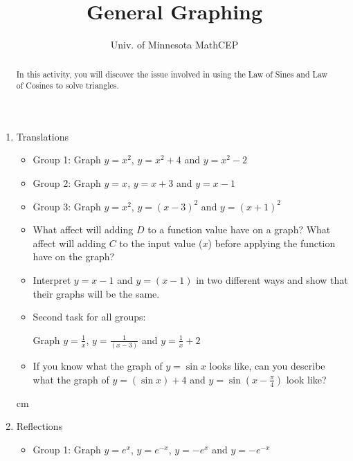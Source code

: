 \documentclass[number]{ximera}
\title{General Graphing}
\author{Univ. of Minnesota MathCEP}
\begin{document}
\begin{abstract}
  In this activity, you will discover the issue involved in using the Law of Sines and Law of Cosines to solve triangles.
\end{abstract}

\maketitle

\begin{enumerate}

\item Translations

\begin{itemize}

\item Group 1: Graph $y = x^2$, $y = x^2 + 4$ and $y = x^2 - 2$

\item Group 2: Graph $y = x$, $y = x+3$ and $y=x-1$

\item Group 3: Graph $y = x^2$, $y = (x-3)^2$ and $y = (x+1)^2$

\item What affect will adding $D$ to a function value have on a graph? What affect will adding $C$ to the input value ($x$) before applying the function have on the graph?

\item Interpret $y = x-1$ and $y = (x-1)$ in two different ways and show that their graphs will be the same.

\item Second task for all groups: 

Graph $y = \displaystyle{\frac{1}{x}}$, $y = \displaystyle{\frac{1}{(x-3)}}$ and $y = \displaystyle{\frac{1}{x} + 2}$

\item If you know what the graph of $y = \sin x$ looks like, can you describe what the graph of $y = (\sin x) + 4$ and $y = \sin (x-\frac{\pi}{4})$ look like?

\end{itemize}

 cm

\item Reflections

\begin{itemize}

\item Group 1: Graph $y = e^x$, $y = e^{-x}$, $y=-e^x$ and $y = -e^{-x}$


\end{itemize}
\end{enumerate}
\end{document}
